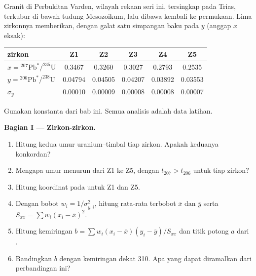 \begin{problem}\label{pb:b3:advanced-geochronology:1}
Granit di Perbukitan Varden, wilayah rekaan seri ini, tersingkap
pada Trias, terkubur di bawah tudung Mesozoikum, lalu dibawa kembali ke
permukaan. Lima zirkonnya memberikan, dengan galat satu simpangan baku pada $y$
(anggap $x$ eksak):
\begin{center}
\small
\begin{tabular}{|l|ccccc|}
\hline
zirkon & Z1 & Z2 & Z3 & Z4 & Z5 \\
\hline
$x = {}^{207}\mathrm{Pb}^*/^{235}\mathrm U$ & 0.3467 & 0.3260 & 0.3027 & 0.2793 & 0.2535 \\
$y = {}^{206}\mathrm{Pb}^*/^{238}\mathrm U$ & 0.04794 & 0.04505 & 0.04207 & 0.03892 & 0.03553 \\
$\sigma_y$ & 0.00010 & 0.00009 & 0.00008 & 0.00008 & 0.00007 \\
\hline
\end{tabular}
\end{center}
Gunakan konstanta dari bab ini. Semua analisis adalah data latihan.

\medskip\noindent\textbf{Bagian I --- Zirkon-zirkon.}
\begin{enumerate}
\item Hitung kedua umur uranium--timbal tiap zirkon. Apakah keduanya konkordan?
\item Mengapa umur menurun dari Z1 ke Z5, dengan $t_{207} > t_{206}$ untuk
tiap zirkon?
\item Hitung koordinat pada  untuk Z1 dan Z5.
\item Dengan bobot $w_i = 1/\sigma_{y,i}^2$, hitung rata-rata terbobot
$\bar x$ dan $\bar y$ serta $S_{xx} = \sum w_i(x_i - \bar x)^2$.
\item Hitung kemiringan $b = \sum w_i(x_i - \bar x)(y_i - \bar y)/S_{xx}$ dan
titik potong $a$ dari .
\item Bandingkan $b$ dengan kemiringan  dekat \qty{310}{\Ma}. Apa
yang dapat diramalkan dari perbandingan ini?
\end{enumerate}


\end{problem}
